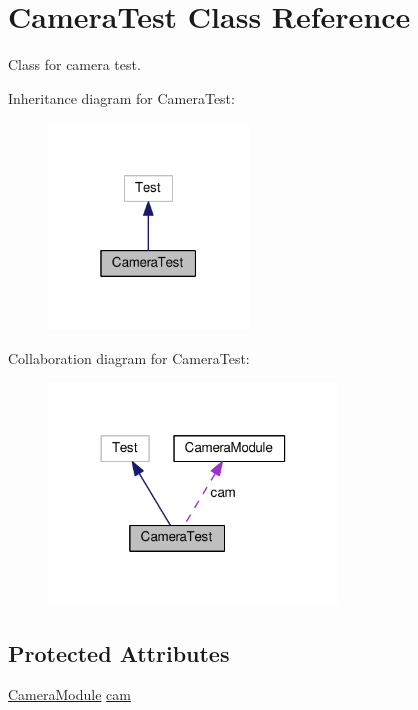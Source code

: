 \hypertarget{class_camera_test}{}\section{Camera\+Test Class Reference}
\label{class_camera_test}


Class for camera test.  




Inheritance diagram for Camera\+Test\+:
\nopagebreak
\begin{figure}[H]
\begin{center}
\leavevmode
\includegraphics[width=151pt]{class_camera_test__inherit__graph}
\end{center}
\end{figure}


Collaboration diagram for Camera\+Test\+:
\nopagebreak
\begin{figure}[H]
\begin{center}
\leavevmode
\includegraphics[width=218pt]{class_camera_test__coll__graph}
\end{center}
\end{figure}
\subsection*{Protected Attributes}
\begin{DoxyCompactItemize}
\item 
\hyperlink{class_camera_module}{Camera\+Module} \hyperlink{class_camera_test_a76aa7e4350e4b5773e5641ffa837b100}{cam}
\end{DoxyCompactItemize}


